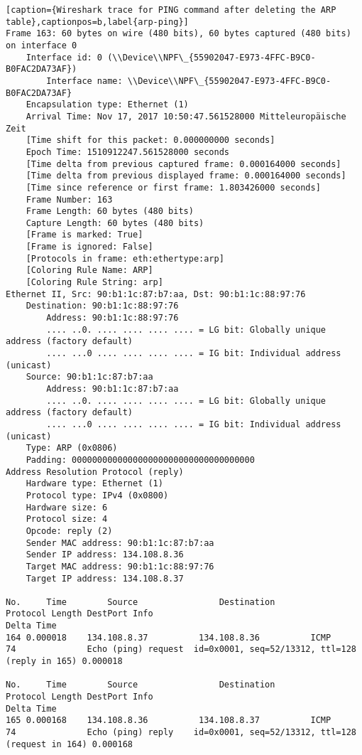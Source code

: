 \begin{lstlisting}[caption={Wireshark trace for PING command after deleting the ARP table},captionpos=b,label{arp-ping}]
Frame 163: 60 bytes on wire (480 bits), 60 bytes captured (480 bits) on interface 0
	Interface id: 0 (\\Device\\NPF\_{55902047-E973-4FFC-B9C0-B0FAC2DA73AF})
		Interface name: \\Device\\NPF\_{55902047-E973-4FFC-B9C0-B0FAC2DA73AF}
	Encapsulation type: Ethernet (1)
	Arrival Time: Nov 17, 2017 10:50:47.561528000 Mitteleuropäische Zeit
	[Time shift for this packet: 0.000000000 seconds]
	Epoch Time: 1510912247.561528000 seconds
	[Time delta from previous captured frame: 0.000164000 seconds]
	[Time delta from previous displayed frame: 0.000164000 seconds]
	[Time since reference or first frame: 1.803426000 seconds]
	Frame Number: 163
	Frame Length: 60 bytes (480 bits)
	Capture Length: 60 bytes (480 bits)
	[Frame is marked: True]
	[Frame is ignored: False]
	[Protocols in frame: eth:ethertype:arp]
	[Coloring Rule Name: ARP]
	[Coloring Rule String: arp]
Ethernet II, Src: 90:b1:1c:87:b7:aa, Dst: 90:b1:1c:88:97:76
	Destination: 90:b1:1c:88:97:76
		Address: 90:b1:1c:88:97:76
		.... ..0. .... .... .... .... = LG bit: Globally unique address (factory default)
		.... ...0 .... .... .... .... = IG bit: Individual address (unicast)
	Source: 90:b1:1c:87:b7:aa
		Address: 90:b1:1c:87:b7:aa
		.... ..0. .... .... .... .... = LG bit: Globally unique address (factory default)
		.... ...0 .... .... .... .... = IG bit: Individual address (unicast)
	Type: ARP (0x0806)
	Padding: 000000000000000000000000000000000000
Address Resolution Protocol (reply)
	Hardware type: Ethernet (1)
	Protocol type: IPv4 (0x0800)
	Hardware size: 6
	Protocol size: 4
	Opcode: reply (2)
	Sender MAC address: 90:b1:1c:87:b7:aa
	Sender IP address: 134.108.8.36
	Target MAC address: 90:b1:1c:88:97:76
	Target IP address: 134.108.8.37

No.     Time        Source                Destination           Protocol Length DestPort Info                                                            Delta Time
164 0.000018    134.108.8.37          134.108.8.36          ICMP     74              Echo (ping) request  id=0x0001, seq=52/13312, ttl=128 (reply in 165) 0.000018

No.     Time        Source                Destination           Protocol Length DestPort Info                                                            Delta Time
165 0.000168    134.108.8.36          134.108.8.37          ICMP     74              Echo (ping) reply    id=0x0001, seq=52/13312, ttl=128 (request in 164) 0.000168


\end{lstlisting}
